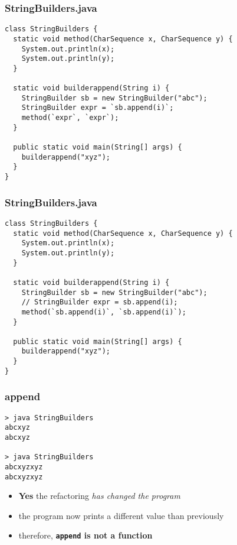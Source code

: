 \begin{frame}[fragile]
\frametitle{StringBuilders.java}
\begin{lstlisting}
class StringBuilders {
  static void method(CharSequence x, CharSequence y) {
    System.out.println(x);
    System.out.println(y);
  }

  static void builderappend(String i) {
    StringBuilder sb = new StringBuilder("abc");
    StringBuilder expr = `sb.append(i)`;
    method(`expr`, `expr`);
  }

  public static void main(String[] args) {
    builderappend("xyz");
  }
}
\end{lstlisting}
\end{frame}

\begin{frame}[fragile]
\frametitle{StringBuilders.java}
\begin{lstlisting}
class StringBuilders {
  static void method(CharSequence x, CharSequence y) {
    System.out.println(x);
    System.out.println(y);
  }

  static void builderappend(String i) {
    StringBuilder sb = new StringBuilder("abc");
    // StringBuilder expr = sb.append(i);
    method(`sb.append(i)`, `sb.append(i)`);
  }

  public static void main(String[] args) {
    builderappend("xyz");
  }
}
\end{lstlisting}
\end{frame}

\begin{frame}[fragile]
\frametitle{append}
\begin{block}{}
\begin{lstlisting}
> java StringBuilders
abcxyz
abcxyz

> java StringBuilders
abcxyzxyz
abcxyzxyz
\end{lstlisting}
\end{block}
\begin{itemize}
  \item<1> \textbf{Yes} the refactoring \emph{has changed the program}
  \item<2> the program now prints a different value than previously
  \item<3> therefore, \textbf{\lstinline$append$ is not a function}
\end{itemize}
\end{frame}
